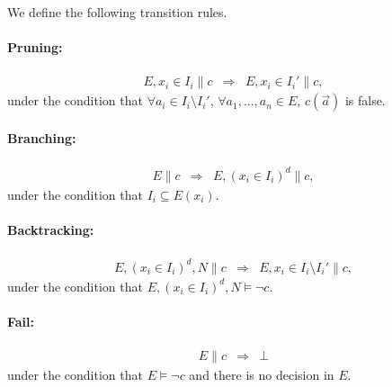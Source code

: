 \documentclass[envcountsect]{llncs}
\begin{document}
\begin{definition} We define the following transition rules. 

\paragraph{Pruning:}
\begin{eqnarray*}
E, x_i\in I_i\parallel c &\Longrightarrow& E, x_i\in I_i'\parallel c,
\end{eqnarray*}
under the condition that $\forall a_i\in I_i\setminus I_i'$, $\forall a_1,...,a_n\in E$,
$c(\vec a)$ is false.

\paragraph{Branching:}
\begin{eqnarray*}
E\parallel c &\Longrightarrow& E, (x_i\in I_i)^d \parallel c,
\end{eqnarray*}
under the condition that $I_i\subseteq E(x_i)$.

\paragraph{Backtracking:}
\begin{eqnarray*}
E, (x_i\in I_i)^d, N\parallel c &\Longrightarrow& E, x_i\in
I_i\setminus I_i'\parallel c, 
\end{eqnarray*}
under the condition that $E, (x_i\in I_i)^d, N \models \neg c$.

\paragraph{Fail:}
\begin{eqnarray*}
E\parallel c &\Longrightarrow& \bot 
\end{eqnarray*}
under the condition that $E \models \neg c$ and there is no decision in $E$. 
\end{definition}
\end{document}
